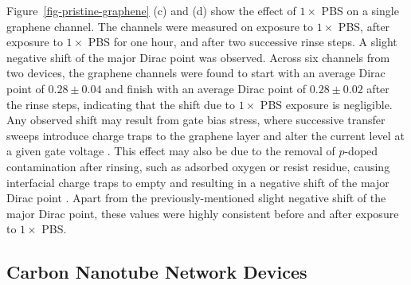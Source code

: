 \documentclass[
  a4paper,
]{scrbook}
\begin{document}
Figure~\ref{fig-pristine-graphene} (c) and (d) show the effect of
\(1 \times\) PBS on a single graphene channel. The channels were
measured on exposure to \(1 \times\) PBS, after exposure to \(1 \times\)
PBS for one hour, and after two successive rinse steps. A slight
negative shift of the major Dirac point was observed. Across six
channels from two devices, the graphene channels were found to start
with an average Dirac point of \(0.28 \pm 0.04\) and finish with an
average Dirac point of \(0.28 \pm 0.02\) after the rinse steps,
indicating that the shift due to \(1 \times\) PBS exposure is
negligible. Any observed shift may result from gate bias stress, where
successive transfer sweeps introduce charge traps to the graphene layer
and alter the current level at a given gate voltage
\autocite{Bargaoui2018,Noyce2019}. This effect may also be due to the
removal of \(p\)-doped contamination after rinsing, such as adsorbed
oxygen or resist residue, causing interfacial charge traps to empty and
resulting in a negative shift of the major Dirac point
\autocite{Bartolomeo2011,Kireev2017,Peng2018}. Apart from the
previously-mentioned slight negative shift of the major Dirac point,
these values were highly consistent before and after exposure to
\(1 \times\) PBS.

\hypertarget{sec-cnt-devices}{%
\subsection{Carbon Nanotube Network Devices}\label{sec-cnt-devices}}
\end{document}
